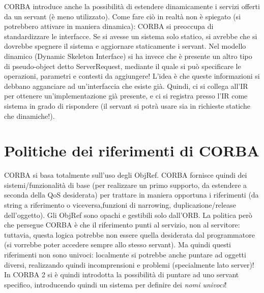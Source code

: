 CORBA introduce anche la possibilità di estendere dinamicamente i servizi offerti da un servant (è meno utilizzato).
Come fare ciò in realtà non è spiegato (si potrebbero attivare in maniera dinamica): CORBA si preoccupa di
standardizzare le interfacce. Se si avesse un sistema solo statico, si avrebbe che si dovrebbe spegnere il sistema e
aggiornare staticamente i servant.
Nel modello dinamico (Dynamic Skeleton Interface) si ha invece che è presente un altro tipo di pseudo-object detto
ServerRequest, mediante il quale si può specificare le operazioni, parametri e contesti da aggiungere! L'idea è che
queste informazioni si debbano agganciare ad un'interfaccia che esiste già. Quindi, ci si collega all'IR per ottenere
un'implementazione già presente, e ci si registra presso l'IR come sistema in grado di rispondere (il servant si potrà
usare sia in richieste statiche che dinamiche!).
\section{Politiche dei riferimenti di CORBA}
CORBA si basa totalmente sull'uso degli ObjRef. CORBA fornisce quindi dei sistemi/funzionalità di base (per realizzare
un primo supporto, da estendere a seconda della QoS desiderata) per trattare in maniera opportuna i riferimenti
(da string a riferimento o viceversa,funzioni di narrowing, duplicazione/release dell'oggetto). Gli ObjRef sono opachi e gestibili solo dall'ORB.
La politica però che persegue CORBA è che il riferimento punti al servizio, non al servitore: tuttavia, questa logica
potrebbe non essere quella desiderata dal programmatore (si vorrebbe poter accedere sempre allo stesso servant). Ma quindi questi riferimenti non sono univoci: localmente si potrebbe anche puntare ad oggetti diversi,
realizzando quindi incomprensioni e problemi (specialmente lato server)!
In CORBA 2 si è quindi introdotta la possibilità di puntare ad uno servant specifico, introducendo quindi un sistema per
definire dei \textit{nomi univoci}!
